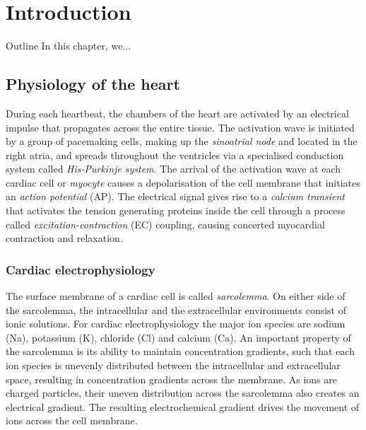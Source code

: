 \chapter{Introduction}\label{cha:chapter1}
%
%
%
\begin{remark}{Outline}
    In this chapter, we...
\end{remark}


%
%
%
\section{Physiology of the heart}
During each heartbeat, the chambers of the heart are activated by an electrical impulse that propagates across the entire tissue. The activation wave is initiated by a group of pacemaking cells, making up the \textit{sinoatrial node} and located in the right atria, and spreads throughout the ventricles via a specialised conduction system called \textit{His-Purkinje system}. The arrival of the activation wave at each cardiac cell or \textit{myocyte} causes a depolarisation of the cell membrane that initiates an \textit{action potential} (\acs{AP}). The electrical signal gives rise to a \textit{calcium transient} that activates the tension generating proteins inside the cell through a process called \textit{excitation-contraction} (\acs{EC}) coupling, causing concerted myocardial contraction and relaxation. 


%
%
%
\subsection{Cardiac electrophysiology}\label{sec:cardiacelecphys}
The surface membrane of a cardiac cell is called \textit{sarcolemma}. On either side of the sarcolemma, the intracellular and the extracellular environments consist of ionic solutions. For cardiac electrophysiology the major ion species are sodium (\acs{Na}), potassium (\acs{K}), chloride (\acs{Cl}) and calcium (\acs{Ca}). An important property of the sarcolemma is its ability to maintain concentration gradients, such that each ion species is unevenly distributed between the intracellular and extracellular space, resulting in concentration gradients across the membrane. As ions are charged particles, their uneven distribution across the sarcolemma also creates an electrical gradient. The resulting electrochemical gradient drives the movement of ions across the cell membrane.

